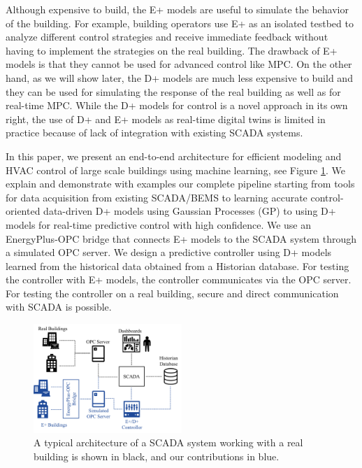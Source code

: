Although expensive to build, the E+ models are useful to simulate the behavior of the building. For example, building operators use E+ as an isolated testbed to analyze different control strategies and receive immediate feedback without having to implement the strategies on the real building.
The drawback of E+ models is that they cannot be used for advanced control like MPC.
On the other hand, as we will show later, %
the D+ models are much less expensive to build and they can be used for simulating the response of the real building as well as for real-time MPC.
While the D+ models for control is a novel approach in its own right, the use of D+ and E+ models as real-time digital twins is limited in practice because of lack of integration with existing SCADA systems.

In this paper, we present an end-to-end architecture for efficient modeling and HVAC control of large scale buildings using machine learning, see Figure \ref{F:intro}. 
We explain and demonstrate with examples our complete pipeline starting from tools for data acquisition from existing SCADA/BEMS to learning accurate control-oriented data-driven D+ models using Gaussian Processes (GP) to using D+ models for real-time predictive control with high confidence.
We use an EnergyPlus-OPC bridge that connects E+ models to the SCADA system through a simulated OPC server. 
We design a predictive controller using D+ models learned from the historical data obtained from a Historian database. 
For testing the controller with E+ models, the controller communicates via the OPC server. 
For testing the controller on a real building, secure and direct communication with SCADA is possible.

\begin{figure}[t]
  \includegraphics[width=0.5\textwidth]{images/overview.png}
  \caption{A typical architecture of a SCADA system working with a real building is shown in black, and our contributions in blue.}
  \label{F:intro}
\end{figure}

